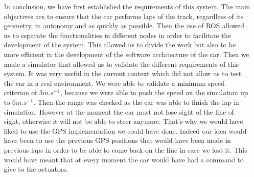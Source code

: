 In conclusion, we have first established the requirements of this
system. The main objectives are to ensure that the car performs
laps of the track, regardless of its geometry, in autonomy and as
quickly as possible. Then the use of ROS allowed us to separate the 
functionalities in different nodes in order to facilitate the
development of the system. This allowed us to divide the work
but also to be more efficient in the development of the software
architecture of the car. Then we made a simulator that allowed
us to validate the different requirements of this system. It was
very useful in the current context which did not allow us to test
the car in a real environment. We were able to validate a minimum
speed criterion of $3 m.s^{-1}$, because we were able to push the speed
on the simulation up to $6 m.s^{-1}$. Then the range was checked as the 
car was able to finish the lap in simulation. However at the moment
the car must not lose sight of the line of sight, otherwise it
will not be able to steer anymore. That's why we would have liked
to use the GPS implementation we could have done. Indeed our idea
would have been to use the previous GPS positions that would have
been made in previous laps in order to be able to come back on the
line in case we lost it. This would have meant that at every moment
the car would have had a command to give to the actuators.

